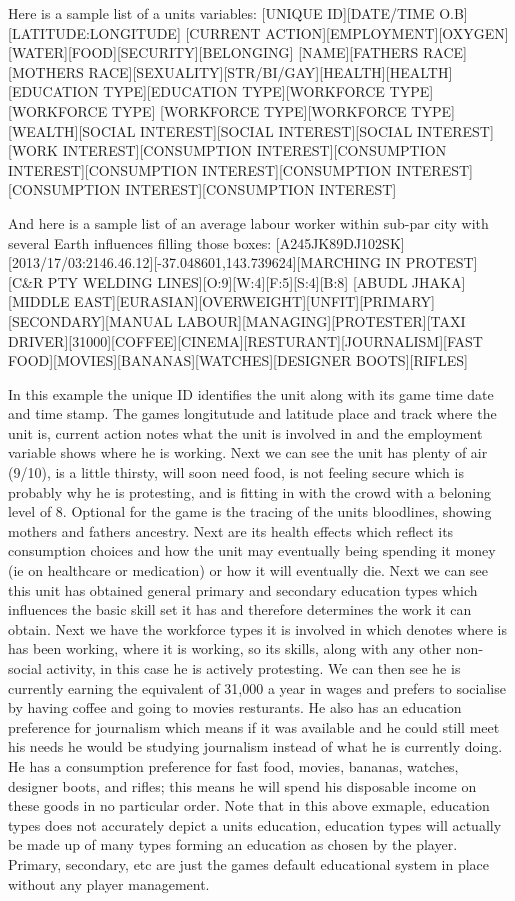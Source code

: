 
Here is a sample list of a units variables:
[UNIQUE ID][DATE/TIME O.B][LATITUDE:LONGITUDE]
[CURRENT ACTION][EMPLOYMENT][OXYGEN][WATER][FOOD][SECURITY][BELONGING]
[NAME][FATHERS RACE][MOTHERS RACE][SEXUALITY][STR/BI/GAY][HEALTH][HEALTH][EDUCATION TYPE][EDUCATION TYPE][WORKFORCE TYPE][WORKFORCE TYPE]
[WORKFORCE TYPE][WORKFORCE TYPE][WEALTH][SOCIAL INTEREST][SOCIAL INTEREST][SOCIAL INTEREST][WORK INTEREST][CONSUMPTION INTEREST][CONSUMPTION INTEREST][CONSUMPTION INTEREST][CONSUMPTION INTEREST][CONSUMPTION INTEREST][CONSUMPTION INTEREST]

And here is a sample list of an average labour worker within sub-par city with several Earth influences filling those boxes:
[A245JK89DJ102SK][2013/17/03:2146.46.12][-37.048601,143.739624][MARCHING IN PROTEST][C&R PTY WELDING LINES][O:9][W:4][F:5][S:4][B:8]
[ABUDL JHAKA][MIDDLE EAST][EURASIAN][OVERWEIGHT][UNFIT][PRIMARY][SECONDARY][MANUAL LABOUR][MANAGING][PROTESTER][TAXI DRIVER][31000][COFFEE][CINEMA][RESTURANT][JOURNALISM][FAST FOOD][MOVIES][BANANAS][WATCHES][DESIGNER BOOTS][RIFLES]



In this example the unique ID identifies the unit along with its game time date and time stamp. The games longitutude and latitude place and track where the unit is, current action notes what the unit is involved in and the employment variable shows where he is working.
Next we can see the unit has plenty of air (9/10), is a little thirsty, will soon need food, is not feeling secure which is probably why he is protesting, and is fitting in with the crowd with a beloning level of 8. Optional for the game is the tracing of the units bloodlines, showing mothers and fathers ancestry. Next are its health effects which reflect its consumption choices and how the unit may eventually being spending it money (ie on healthcare or medication) or how it will eventually die. Next we can see this unit has obtained general primary and secondary education types which influences the basic skill set it has and therefore determines the work it can obtain. Next we have the workforce types it is involved in which denotes where is has been working, where it is working, so its skills, along with any other non-social activity, in this case he is actively protesting. We can then see he is currently earning the equivalent of 31,000 a year in wages and prefers to socialise by having coffee and going to movies resturants. He also has an education preference for journalism which means if it was available and he could still meet his needs he would be studying journalism instead of what he is currently doing. He has 
a consumption preference for fast food, movies, bananas, watches, designer boots, and rifles; this means he will spend his disposable income on these goods in no particular order. Note that in this above exmaple, education types does not accurately depict a units education, education types will actually be made up of many types forming an education as chosen by the player. Primary, secondary, etc are just the games default educational system in place without any player management.

